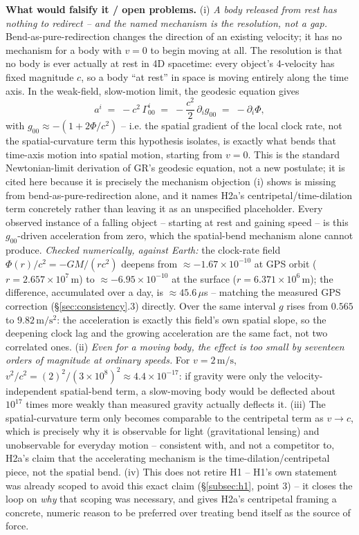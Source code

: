 \documentclass[12pt, a4paper]{article}
\begin{document}
\textbf{What would falsify it / open problems.}
(i) \emph{A body released from rest has nothing to redirect -- and the
named mechanism is the resolution, not a gap.} Bend-as-pure-redirection
changes the direction of an existing velocity; it has no mechanism for
a body with $v=0$ to begin moving at all. The resolution is that no
body is ever actually at rest in 4D spacetime: every object's
4-velocity has fixed magnitude $c$, so a body ``at rest'' in space is
moving entirely along the time axis. In the weak-field, slow-motion
limit, the geodesic equation gives
\begin{equation}
a^i \;=\; -c^2\,\Gamma^i_{00} \;=\; -\frac{c^2}{2}\,\partial_i g_{00} \;=\; -\partial_i\Phi,
\end{equation}
with $g_{00}\approx-(1+2\Phi/c^2)$ -- i.e. the spatial gradient of the
local clock rate, not the spatial-curvature term this hypothesis
isolates, is exactly what bends that time-axis motion into spatial
motion, starting from $v=0$. This is the standard Newtonian-limit
derivation of GR's geodesic equation, not a new postulate; it is cited
here because it is precisely the mechanism objection (i) shows is
missing from bend-as-pure-redirection alone, and it names H2a's
centripetal/time-dilation term concretely rather than leaving it as
an unspecified placeholder. Every observed instance of a falling
object -- starting at rest and gaining speed -- is this $g_{00}$-driven
acceleration from zero, which the spatial-bend mechanism alone cannot
produce. \emph{Checked numerically, against Earth:} the clock-rate
field $\Phi(r)/c^2=-GM/(rc^2)$ deepens from $\approx-1.67\times10^{-10}$
at GPS orbit ($r=2.657\times10^7\,\mathrm{m}$) to
$\approx-6.95\times10^{-10}$ at the surface
($r=6.371\times10^6\,\mathrm{m}$); the difference, accumulated over a
day, is $\approx45.6\,\mu$s -- matching the measured GPS correction
(\S\ref{sec:consistency}.3) directly. Over the same interval $g$ rises
from $0.565$ to $9.82\,\mathrm{m/s^2}$: the acceleration is exactly
this field's own spatial slope, so the deepening clock lag and the
growing acceleration are the same fact, not two correlated ones. (ii) \emph{Even for a moving body, the effect is too small by
seventeen orders of magnitude at ordinary speeds.} For $v=2\,\mathrm{m/s}$,
$v^2/c^2=(2)^2/(3\times10^8)^2\approx4.4\times10^{-17}$: if gravity
were only the velocity-independent spatial-bend term, a slow-moving
body would be deflected about $10^{17}$ times more weakly than
measured gravity actually deflects it. (iii) The spatial-curvature
term only becomes comparable to the centripetal term as $v\to c$,
which is precisely why it is observable for light (gravitational
lensing) and unobservable for everyday motion -- consistent with, and
not a competitor to, H2a's claim that the accelerating mechanism is
the time-dilation/centripetal piece, not the spatial bend. (iv) This
does not retire H1 -- H1's own statement was already scoped to avoid
this exact claim (\S\ref{subsec:h1}, point 3) -- it closes the loop on
\emph{why} that scoping was necessary, and gives H2a's centripetal
framing a concrete, numeric reason to be preferred over treating bend
itself as the source of force.
\end{document}
